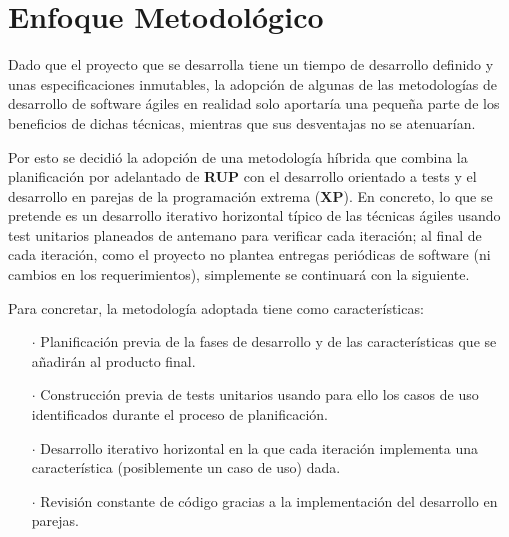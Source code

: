 %
%
%
%
\section{Enfoque Metodológico}

Dado que el proyecto que se desarrolla tiene un tiempo de desarrollo definido y unas especificaciones inmutables, la adopción de algunas de las metodologías de desarrollo de software ágiles en realidad solo aportaría una pequeña parte de los beneficios de dichas técnicas, mientras que sus desventajas no se atenuarían.

Por esto se decidió la adopción de una metodología híbrida que combina la planificación por adelantado de \textbf{RUP} con el desarrollo orientado a tests y el desarrollo en parejas de la programación extrema (\textbf{XP}). En concreto, lo que se pretende es un desarrollo iterativo horizontal típico de las técnicas ágiles usando test unitarios planeados de antemano para verificar cada iteración; al final de cada iteración, como el proyecto no plantea entregas periódicas de software (ni cambios en los requerimientos), simplemente se continuará con la siguiente.

Para concretar, la metodología adoptada tiene como características:

\begin{enumerate}
  \item[\(\cdot\)] Planificación previa de la fases de desarrollo y de las características que se añadirán al producto final.
  \item[\(\cdot\)] Construcción previa de tests unitarios usando para ello los casos de uso identificados durante el proceso de planificación.
  \item[\(\cdot\)] Desarrollo iterativo horizontal en la que cada iteración implementa una característica (posiblemente un caso de uso) dada.
  \item[\(\cdot\)] Revisión constante de código gracias a la implementación del desarrollo en parejas.
\end{enumerate}
